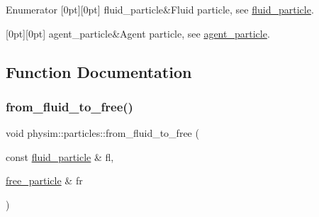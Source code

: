 \begin{DoxyEnumFields}{Enumerator}
[0pt][0pt]{}\mbox{\label{namespacephysim_1_1particles_a068e6cda6626fbd381c07a9835425b08acd1fa3faece552fbe658256d4d05d2a6}} 
fluid\+\_\+particle&Fluid particle, see \hyperlink{classphysim_1_1particles_1_1fluid__particle}{fluid\+\_\+particle}. \\
\hline

[0pt][0pt]{}\mbox{\label{namespacephysim_1_1particles_a068e6cda6626fbd381c07a9835425b08a8f5a9a8c6aed38c79edad63bfc681c2c}} 
agent\+\_\+particle&Agent particle, see \hyperlink{classphysim_1_1particles_1_1agent__particle}{agent\+\_\+particle}. \\
\hline

\end{DoxyEnumFields}


\subsection{Function Documentation}
\mbox{\label{namespacephysim_1_1particles_a48784a80a2e7e633a40a79fcd54e4f55}} 
\subsubsection{\texorpdfstring{from\+\_\+fluid\+\_\+to\+\_\+free()}{from\_fluid\_to\_free()}}
{\footnotesize\ttfamily void physim\+::particles\+::from\+\_\+fluid\+\_\+to\+\_\+free (\begin{DoxyParamCaption}\item[{const \hyperlink{classphysim_1_1particles_1_1fluid__particle}{fluid\+\_\+particle} \&}]{fl,  }\item[{\hyperlink{classphysim_1_1particles_1_1free__particle}{free\+\_\+particle} \&}]{fr }\end{DoxyParamCaption})}



